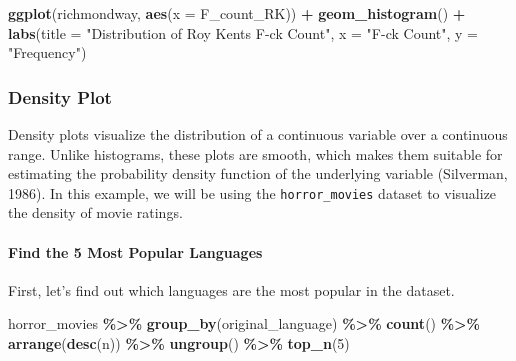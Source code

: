 \documentclass[
]{book}
\newenvironment{Shaded}{\begin{snugshade}}{\end{snugshade}}
\newcommand{\AttributeTok}[1]{\textcolor[rgb]{0.13,0.29,0.53}{#1}}
\newcommand{\DecValTok}[1]{\textcolor[rgb]{0.00,0.00,0.81}{#1}}
\newcommand{\FunctionTok}[1]{\textcolor[rgb]{0.13,0.29,0.53}{\textbf{#1}}}
\newcommand{\NormalTok}[1]{#1}
\newcommand{\SpecialCharTok}[1]{\textcolor[rgb]{0.81,0.36,0.00}{\textbf{#1}}}
\newcommand{\StringTok}[1]{\textcolor[rgb]{0.31,0.60,0.02}{#1}}
\begin{document}
\begin{Shaded}
\begin{Highlighting}[]
\FunctionTok{ggplot}\NormalTok{(richmondway, }\FunctionTok{aes}\NormalTok{(}\AttributeTok{x =}\NormalTok{ F\_count\_RK)) }\SpecialCharTok{+}
  \FunctionTok{geom\_histogram}\NormalTok{() }\SpecialCharTok{+}
  \FunctionTok{labs}\NormalTok{(}\AttributeTok{title =} \StringTok{"Distribution of Roy Kent\textquotesingle{}s F{-}ck Count"}\NormalTok{,}
       \AttributeTok{x =} \StringTok{"F{-}ck Count"}\NormalTok{,}
       \AttributeTok{y =} \StringTok{"Frequency"}\NormalTok{)}
\end{Highlighting}
\end{Shaded}

\hypertarget{density-plot}{%
\subsubsection*{Density Plot}\label{density-plot}}

Density plots visualize the distribution of a continuous variable over a continuous range. Unlike histograms, these plots are smooth, which makes them suitable for estimating the probability density function of the underlying variable (Silverman, 1986). In this example, we will be using the \texttt{horror\_movies} dataset to visualize the density of movie ratings.

\hypertarget{find-the-5-most-popular-languages}{%
\paragraph*{Find the 5 Most Popular Languages}\label{find-the-5-most-popular-languages}}

First, let's find out which languages are the most popular in the dataset.

\begin{Shaded}
\begin{Highlighting}[]
\NormalTok{horror\_movies }\SpecialCharTok{\%\textgreater{}\%}
  \FunctionTok{group\_by}\NormalTok{(original\_language) }\SpecialCharTok{\%\textgreater{}\%}
  \FunctionTok{count}\NormalTok{() }\SpecialCharTok{\%\textgreater{}\%}
  \FunctionTok{arrange}\NormalTok{(}\FunctionTok{desc}\NormalTok{(n)) }\SpecialCharTok{\%\textgreater{}\%}
  \FunctionTok{ungroup}\NormalTok{() }\SpecialCharTok{\%\textgreater{}\%}
  \FunctionTok{top\_n}\NormalTok{(}\DecValTok{5}\NormalTok{)}
\end{Highlighting}
\end{Shaded}
\end{document}
